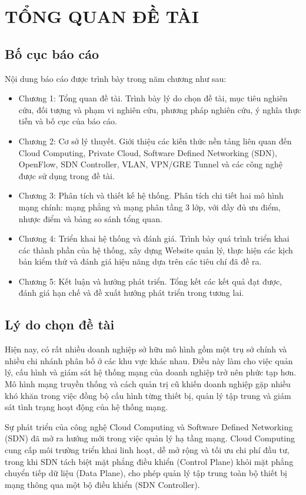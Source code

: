 \section{TỔNG QUAN ĐỀ TÀI}

\subsection{Bố cục báo cáo}
Nội dung báo cáo được trình bày trong năm chương như sau:
\begin{itemize}
    \item Chương 1: Tổng quan đề tài. Trình bày lý do chọn đề tài, mục tiêu nghiên cứu, đối tượng và phạm vi nghiên cứu, phương pháp nghiên cứu, ý nghĩa thực tiễn và bố cục của báo cáo.
    \item Chương 2: Cơ sở lý thuyết. Giới thiệu các kiến thức nền tảng liên quan đến Cloud Computing, Private Cloud, Software Defined Networking (SDN), OpenFlow, SDN Controller, VLAN, VPN/GRE Tunnel và các công nghệ được sử dụng trong đề tài.
    \item Chương 3: Phân tích và thiết kế hệ thống. Phân tích chi tiết hai mô hình mạng chính: mạng phẳng và mạng phân tầng 3 lớp, với đầy đủ ưu điểm, nhược điểm và bảng so sánh tổng quan.
    \item Chương 4: Triển khai hệ thống và đánh giá. Trình bày quá trình triển khai các thành phần của hệ thống, xây dựng Website quản lý, thực hiện các kịch bản kiểm thử và đánh giá hiệu năng dựa trên các tiêu chí đã đề ra.
    \item Chương 5: Kết luận và hướng phát triển. Tổng kết các kết quả đạt được, đánh giá hạn chế và đề xuất hướng phát triển trong tương lai.
\end{itemize}

\subsection{Lý do chọn đề tài}
Hiện nay, có rất nhiều doanh nghiệp sở hữu mô hình gồm một trụ sở chính và nhiều chi nhánh phân bố ở các khu vực khác nhau. Điều này làm cho việc quản lý, cấu hình và giám sát hệ thống mạng của doanh nghiệp trở nên phức tạp hơn. Mô hình mạng truyền thống và cách quản trị cũ khiến doanh nghiệp gặp nhiều khó khăn trong việc đồng bộ cấu hình từng thiết bị, quản lý tập trung và giám sát tình trạng hoạt động của hệ thống mạng.

Sự phát triển của công nghệ Cloud Computing và Software Defined Networking (SDN) đã mở ra hướng mới trong việc quản lý hạ tầng mạng. Cloud Computing cung cấp môi trường triển khai linh hoạt, dễ mở rộng và tối ưu chi phí đầu tư, trong khi SDN tách biệt mặt phẳng điều khiển (Control Plane) khỏi mặt phẳng chuyển tiếp dữ liệu (Data Plane), cho phép quản lý tập trung toàn bộ thiết bị mạng thông qua một bộ điều khiển (SDN Controller).

